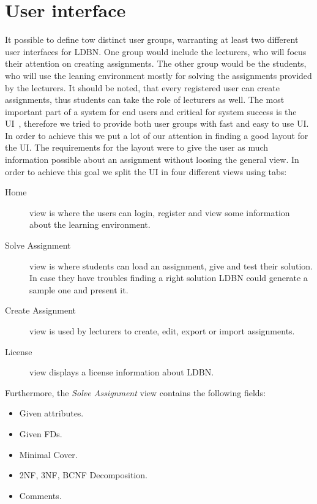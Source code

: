 \section{User interface}
It possible to define tow distinct user groups, warranting at least two different
user interfaces for LDBN.  One group would include the lecturers, who will
focus their attention on creating assignments. The other group would be the 
students, who will use the leaning environment mostly for solving 
the assignments provided by the lecturers. It should be noted, that every registered
user can create assignments, thus students can take the role of lecturers as well.
The most important part of a system for end users and critical for system 
success is the UI~\cite{p9}, therefore we tried to provide both 
user groups with fast and easy to use UI. In order to achieve this we put a lot
of our attention in finding a good layout for the UI. The requirements for
the layout were to give the user as much information possible about an 
assignment without loosing the general view. In order to achieve this goal  
we split the UI in four different views using tabs:

\begin{description}
	\item[Home] view is where the users can login, register and view some information 
	about the learning environment.
	\item[Solve Assignment] view is where students can load an assignment, give and
	test their solution. In case they have troubles finding a right solution
	LDBN could generate a sample one and present it.  
	\item[Create Assignment] view is used by lecturers to create, edit, export or import
	assignments.  
	\item[License] view displays a license information about LDBN.
\end{description} 

Furthermore, the \textit{Solve Assignment} view contains the following fields:

\begin{itemize}
	\item Given attributes.
	\item Given FDs.
	\item Minimal Cover.
	\item 2NF, 3NF, BCNF Decomposition.
	\item Comments.
\end{itemize}

